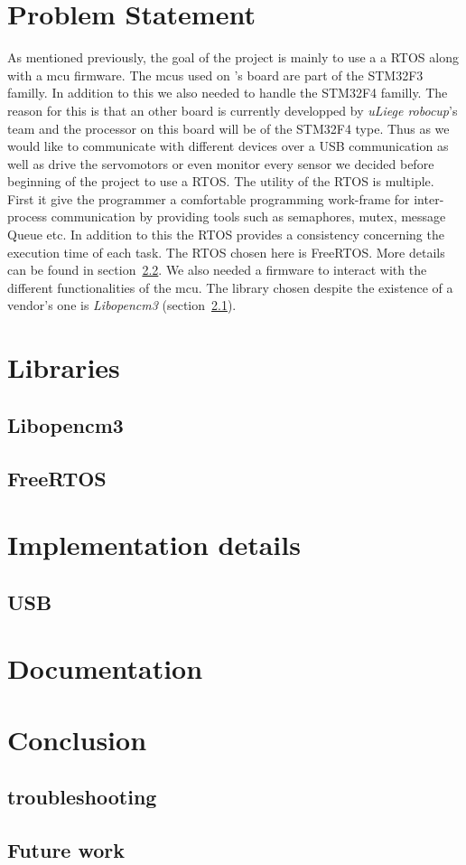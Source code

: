 \documentclass[12pt,a4paper]{report}
\begin{document}
\chapter{Problem Statement}
\label{ch:prob}
As mentioned previously, the goal of the project is mainly to use a a RTOS along with a mcu firmware. The mcus used on \cite{masterGL}'s board are part of the STM32F3 familly. In addition to this we also needed to handle the STM32F4 familly. The reason for this is that an other board is currently developped by \emph{uLiege robocup}'s team and the processor on this board will be of the STM32F4 type.\newline
Thus as we would like to communicate with different devices over a USB communication as well as drive the servomotors or even monitor every sensor we decided before beginning of the project to use a RTOS.\newline
The utility of the RTOS is multiple. First it give the programmer a comfortable programming work-frame for inter-process communication by providing tools such as semaphores, mutex, message Queue etc. In addition to this the RTOS provides a consistency concerning the execution time of each task.\newline
The RTOS chosen here is FreeRTOS. More details can be found in section~\ref{sec:freeRTOS}. We also needed a firmware to interact with the different functionalities of the mcu. The library chosen despite the existence of a vendor's one is \emph{Libopencm3} (section~\ref{sec:libopencm3}). 
\chapter{Libraries}
\section{Libopencm3}
\label{sec:libopencm3}
\section{FreeRTOS}
\label{sec:freeRTOS}
\chapter{Implementation details}
\section{USB}
\chapter{Documentation}
\chapter{Conclusion}
\section{troubleshooting}
\section{Future work}
 

\end{document}
